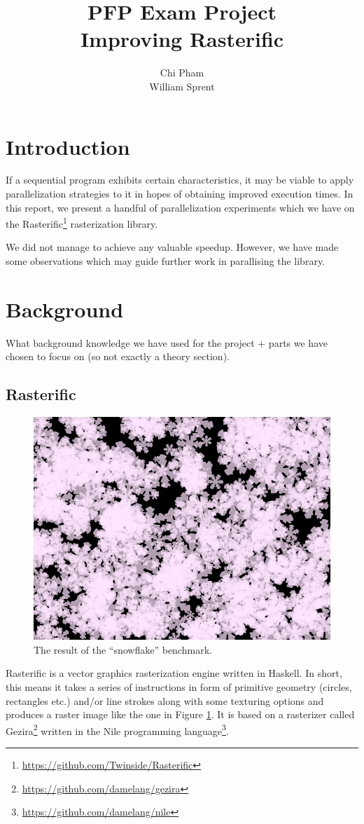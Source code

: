 \documentclass[12pt, a4paper]{article}
\begin{document}
\author{Chi Pham\\William Sprent}
\title{PFP Exam Project\\Improving Rasterific}
\maketitle

\tableofcontents
\clearpage

\section{Introduction}
If a sequential program exhibits certain characteristics, it may be viable to apply parallelization strategies to it in hopes of
 obtaining improved execution times.
In this report, we present a handful of parallelization experiments which we have 
on the Rasterific\footnote{\url{https://github.com/Twinside/Rasterific}} rasterization library.

 We did not manage to achieve any valuable speedup. However, we have made some observations which may guide
 further work in parallising the library.
\section{Background}\label{background}

What background knowledge we have used for the project + parts we have chosen to focus on (so not exactly a theory section).

\subsection{Rasterific}
\begin{figure}[h!]
  \centering
  \includegraphics[width=.4\linewidth]{../flakes}
  \caption{The result of the ``snowflake'' benchmark.}
  \label{fig:snowflakes}
\end{figure}

Rasterific is a vector graphics rasterization engine written in Haskell. In short, this means it takes a series
of instructions in form of primitive geometry (circles, rectangles etc.) and/or line strokes along with some texturing options and produces a raster image like the
 one in Figure \ref{fig:snowflakes}. It is based
 on a rasterizer called Gezira\footnote{\url{https://github.com/damelang/gezira}} written in the Nile programming language\footnote{\url{https://github.com/damelang/nile}}.
\end{document}
